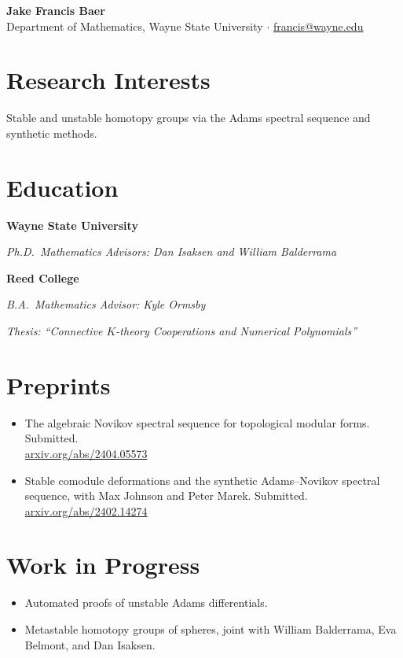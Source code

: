 \documentclass[11pt]{article}
\newlength{\cvdatew}
\newcommand{\cvline}[2]{%
  \settowidth{\cvdatew}{#2}%
  \noindent
  \begin{minipage}[t]{\dimexpr\linewidth-\cvdatew-1em\relax}\raggedright\textbf{#1}\end{minipage}%
  \hfill
  \makebox[\cvdatew][r]{#2}\par}
\newcommand{\cvdetail}[1]{{\itshape #1}\par}
\newcommand{\cvgap}{\vspace{0.55em}}
\begin{document}
\begin{center}
  {\LARGE\bfseries Jake Francis Baer}\\[0.4em]
  Department of Mathematics, Wayne State University \quad$\cdot$\quad
  \href{mailto:francis@wayne.edu}{francis@wayne.edu}
\end{center}
\vspace{0.4em}

\section{Research Interests}
Stable and unstable homotopy groups via the Adams spectral sequence and
synthetic methods.

\section{Education}
\cvline{Wayne State University}{2021 -- Present}
\cvdetail{Ph.D.\ Mathematics \quad Advisors: Dan Isaksen and William Balderrama}
\cvgap
\cvline{Reed College}{2016 -- 2021}
\cvdetail{B.A.\ Mathematics \quad Advisor: Kyle Ormsby}
\cvdetail{Thesis: ``Connective $K$-theory Cooperations and Numerical Polynomials''}

\section{Preprints}
\begin{itemize}
  \item The algebraic Novikov spectral sequence for topological modular forms.
        Submitted. \\ \href{https://arxiv.org/abs/2404.05573}{arxiv.org/abs/2404.05573}
  \item Stable comodule deformations and the synthetic Adams--Novikov spectral
        sequence, with Max Johnson and Peter Marek. Submitted. \\
        \href{https://arxiv.org/abs/2402.14274}{arxiv.org/abs/2402.14274}
\end{itemize}

\section{Work in Progress}
\begin{itemize}
  \item Automated proofs of unstable Adams differentials.
  \item Metastable homotopy groups of spheres, joint with William Balderrama,
        Eva Belmont, and Dan Isaksen.
\end{itemize}
\end{document}
